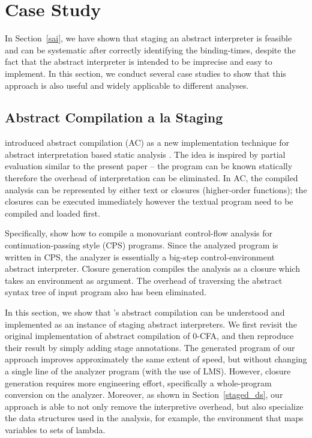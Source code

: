 \section{Case Study} \label{cases_study}

In Section~\ref{sai}, we have shown that staging an abstract interpreter is feasible and can be 
systematic after correctly identifying the binding-times, despite the fact that the abstract 
interpreter is intended to be imprecise and easy to implement. 
In this section, we conduct several case studies to show that this approach is also useful and
widely applicable to different analyses.

\subsection{Abstract Compilation a la Staging} \label{cs_ac}

\citeauthor{Boucher:1996:ACN:647473.727587} introduced abstract compilation (AC) as a new
implementation technique for abstract interpretation based static analysis \cite{Boucher:1996:ACN:647473.727587}.
The idea is inspired by partial evaluation similar to the present paper -- the program can be known 
statically therefore the overhead of interpretation can be eliminated. 
In AC, the compiled analysis can be represented by either text or closures (higher-order functions);
the closures can be executed immediately however the textual program need to be compiled and loaded first.

Specifically, \citeauthor{Boucher:1996:ACN:647473.727587} show how to compile a monovariant control-flow 
analysis \cite{Shivers:1991:SSC:115865.115884, Shivers:1988:CFA:53990.54007} 
for continuation-passing style (CPS) programs. Since the analyzed program is written in CPS, the analyzer 
is essentially a big-step control-environment abstract interpreter.
Closure generation compiles the analysis as a closure which takes an environment as argument.
The overhead of traversing the abstract syntax tree of input program also has been eliminated.

In this section, we show that \citeauthor{Boucher:1996:ACN:647473.727587}'s abstract compilation can be 
understood and implemented as an instance of staging abstract interpreters.
We first revisit the original implementation of abstract compilation of 0-CFA,
and then reproduce their result by simply adding stage annotations.
The generated program of our approach improves approximately the same extent of speed,
but without changing a single line of the analyzer program (with the use of LMS).
However, closure generation requires more engineering effort, specifically a whole-program 
conversion on the analyzer. Moreover, as shown in Section~\ref{staged_ds}, 
our approach is able to not only remove the interpretive overhead, but also specialize 
the data structures used in the analysis, for example, the environment that maps variables to sets of lambda.

